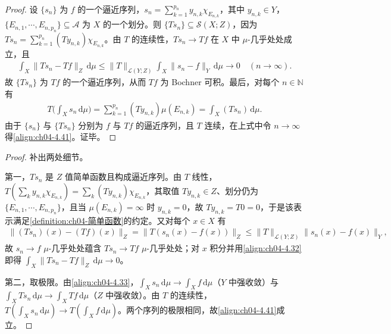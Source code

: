 \documentclass[../../main.tex]{subfiles}%
\begin{document}
\begin{proof}
设 $\{s_n\}$ 为 $f$ 的一个逼近序列，$s_n=\sum_{k=1}^{p_n}y_{n,k}\chi_{E_{n,k}}$，其中 $y_{n,k}\in Y$，$\{E_{n,1},\cdots ,E_{n,p_n}\}\subseteq\mathcal{A}$ 为 $X$ 的一个划分。则 $\{Ts_n\}\subseteq\mathcal{S}(X;Z)$，因为 $Ts_n=\sum_{k=1}^{p_n}(Ty_{n,k})\chi_{E_{n,k}}$。由 $T$ 的连续性，$Ts_n\to Tf$ 在 $X$ 中 $\mu$-几乎处处成立，且
\begin{align*}
\int_X\|Ts_n-Tf\|_Z\,\mathrm{d}\mu\leqslant\|T\|_{\mathcal{L}(Y;Z)}\int_X\|s_n-f\|_Y\,\mathrm{d}\mu\to0\quad(n\to\infty).
\end{align*}
故 $\{Ts_n\}$ 为 $Tf$ 的一个逼近序列，从而 $Tf$ 为 Bochner 可积。最后，对每个 $n\in\mathbb{N}$ 有
\begin{align*}
T\Big(\int_X s_n\,\mathrm{d}\mu\Big)=\sum_{k=1}^{p_n}(Ty_{n,k})\mu(E_{n,k})=\int_X(Ts_n)\,\mathrm{d}\mu.
\end{align*}
由于 $\{s_n\}$ 与 $\{Ts_n\}$ 分别为 $f$ 与 $Tf$ 的逼近序列，且 $T$ 连续，在上式中令 $n\to\infty$ 得\eqref{align:ch04-4.41}。证毕。
\end{proof}

\begin{proof}
补出两处细节。

第一，$Ts_n$ 是 $Z$ 值简单函数且构成逼近序列。由 $T$ 线性，$T(\sum_ky_{n,k}\chi_{E_{n,k}})=\sum_k(Ty_{n,k})\chi_{E_{n,k}}$，其取值 $Ty_{n,k}\in Z$、划分仍为 $\{E_{n,1},\cdots ,E_{n,p_n}\}$，且当 $\mu(E_{n,k})=\infty$ 时 $y_{n,k}=0$，故 $Ty_{n,k}=T0=0$，于是该表示满足\cref{definition:ch04-简单函数}的约定。又对每个 $x\in X$ 有
\begin{align*}
\|(Ts_n)(x)-(Tf)(x)\|_Z=\|T(s_n(x)-f(x))\|_Z\leqslant\|T\|_{\mathcal{L}(Y;Z)}\|s_n(x)-f(x)\|_Y,
\end{align*}
故 $s_n\to f$ $\mu$-几乎处处蕴含 $Ts_n\to Tf$ $\mu$-几乎处处；对 $x$ 积分并用\eqref{align:ch04-4.32}即得 $\int_X\|Ts_n-Tf\|_Z\,\mathrm{d}\mu\to0$。

第二，取极限。由\eqref{align:ch04-4.33}，$\int_X s_n\,\mathrm{d}\mu\to\int_X f\,\mathrm{d}\mu$（$Y$ 中强收敛）与 $\int_X Ts_n\,\mathrm{d}\mu\to\int_X Tf\,\mathrm{d}\mu$（$Z$ 中强收敛）。由 $T$ 的连续性，$T(\int_X s_n\,\mathrm{d}\mu)\to T(\int_X f\,\mathrm{d}\mu)$。两个序列的极限相同，故\eqref{align:ch04-4.41}成立。
\end{proof}
\end{document}
